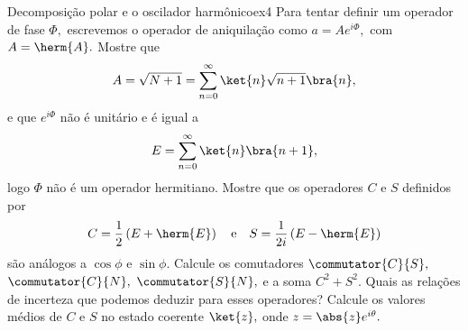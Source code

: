 \begin{exercício}{Decomposição polar e o oscilador harmônico}{ex4}
   Para tentar definir um operador de fase \(\Phi,\) escrevemos o operador de aniquilação como \(a = A e^{i \Phi},\) com \(A = \herm{A}.\) Mostre que
   \begin{equation*}
      A = \sqrt{N + 1} = \sum_{n = 0}^{\infty} \ket{n} \sqrt{n+1} \bra{n},
   \end{equation*}
   e que \(e^{i \Phi}\) não é unitário e é igual a
   \begin{equation*}
      E = \sum_{n = 0}^\infty \ket{n}\bra{n+1},
   \end{equation*}
   logo \(\Phi\) não é um operador hermitiano. Mostre que os operadores \(C\) e \(S\) definidos por
   \begin{equation*}
      C = \frac{1}{2} \left(E + \herm{E}\right)
      \quad\text{e}\quad
      S = \frac1{2i} \left(E - \herm{E}\right)
   \end{equation*}
   são análogos a \(\cos\phi\) e \(\sin\phi.\) Calcule os comutadores \(\commutator{C}{S},\) \(\commutator{C}{N},\) \(\commutator{S}{N},\) e a soma \(C^2 + S^2.\) Quais as relações de incerteza que podemos deduzir para esses operadores? Calcule os valores médios de \(C\) e \(S\) no estado coerente \(\ket{z},\) onde \(z = \abs{z} e^{i\theta}.\)
\end{exercício}
